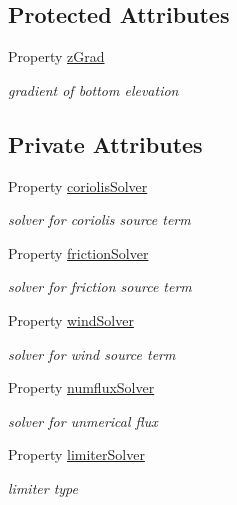 \subsection*{Protected Attributes}
\begin{DoxyCompactItemize}
\item 
Property \hyperlink{class_s_w_e_abstract3d_aab40d4b93b0543f975a46276ef3ea756}{z\+Grad}
\begin{DoxyCompactList}\small\item\em gradient of bottom elevation \end{DoxyCompactList}\end{DoxyCompactItemize}
\subsection*{Private Attributes}
\begin{DoxyCompactItemize}
\item 
Property \hyperlink{class_s_w_e_abstract3d_a5d8d169211a5ee0e646192e05edfde5d}{coriolis\+Solver}
\begin{DoxyCompactList}\small\item\em solver for coriolis source term \end{DoxyCompactList}\item 
Property \hyperlink{class_s_w_e_abstract3d_affc1a8ce49b4cdc93cb956d6341d7f16}{friction\+Solver}
\begin{DoxyCompactList}\small\item\em solver for friction source term \end{DoxyCompactList}\item 
Property \hyperlink{class_s_w_e_abstract3d_a53c1f46f7b01c1dbad920b83dd9ed36d}{wind\+Solver}
\begin{DoxyCompactList}\small\item\em solver for wind source term \end{DoxyCompactList}\item 
Property \hyperlink{class_s_w_e_abstract3d_a4e6aa02d6857950bcc2e05b77b69e7db}{numflux\+Solver}
\begin{DoxyCompactList}\small\item\em solver for unmerical flux \end{DoxyCompactList}\item 
Property \hyperlink{class_s_w_e_abstract3d_a01c616bca35e8321faccb766b515908f}{limiter\+Solver}
\begin{DoxyCompactList}\small\item\em limiter type \end{DoxyCompactList}\end{DoxyCompactItemize}


